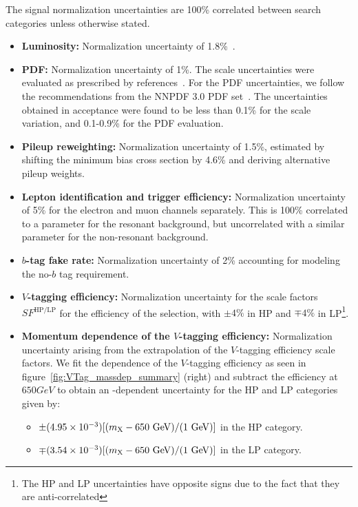 The signal normalization uncertainties are 100\% correlated between search categories unless otherwise stated.
\begin{itemize}
  \item {\bfseries Luminosity:} Normalization uncertainty of 1.8\%~\cite{LumiPOG}.
  \item {\bfseries PDF:} Normalization uncertainty of 1\%.
  The scale uncertainties were evaluated as prescribed by references~\cite{Cacciari_2004,Catani_2003}.
  For the PDF uncertainties, we follow the recommendations from the NNPDF 3.0 PDF set~\cite{Ball2011296}.
  The uncertainties obtained in acceptance were found to be less than 0.1\% for the scale variation, and 0.1-0.9\% for the PDF evaluation.
  \item {\bfseries Pileup reweighting:} Normalization uncertainty of 1.5\%, estimated by shifting the minimum bias cross section by 4.6\% and deriving alternative pileup weights.
  \item {\bfseries Lepton identification and trigger efficiency:} Normalization uncertainty of 5\% for the electron and muon channels separately.
  This is 100\% correlated to a parameter for the resonant background, but uncorrelated with a similar parameter for the non-resonant background.
  \item {\bfseries $b$-tag fake rate:} Normalization uncertainty of 2\% accounting for modeling the no-$b$ tag requirement.
  \item {\bfseries $V$-tagging efficiency:} Normalization uncertainty for the scale factors $SF^{\mathrm{HP}/\mathrm{LP}}$ for the efficiency of the \nsubjDDT selection, with $\pm4\%$ in HP and $\mp4\%$ in LP\footnote{The HP and LP uncertainties have opposite signs due to the fact that they are anti-correlated}.
  \item {\bfseries Momentum dependence of the $V$-tagging efficiency:} Normalization uncertainty arising from the extrapolation of the $V$-tagging efficiency scale factors.
  We fit the \MX dependence of the $V$-tagging efficiency as seen in figure~\ref{fig:VTag_massdep_summary} (right) and subtract the efficiency at $650\unit{GeV}$ to obtain an \MX-dependent uncertainty for the HP and LP categories given by:
  \begin{itemize}
    \item $\pm(4.95\times10^{-3})[(\MX-650\unit{GeV})/(1\unit{GeV})]$ in the HP category.
    \item $\mp(3.54\times10^{-3})[(\MX-650\unit{GeV})/(1\unit{GeV})]$ in the LP category.

\end{itemize}
\end{itemize}
